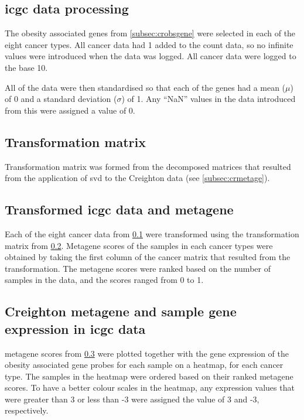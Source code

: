 \subsection{\gls{icgc} data processing}
\label{subsec:datprocicgc}

The obesity associated genes from \cref{subsec:crobsgene} were selected in each of the eight cancer types.
All cancer data had 1 added to the count data, so no infinite values were introduced when the data was logged.
All cancer data were logged to the base 10.

All of the data were then standardised so that each of the genes had a mean ($\mu$) of 0 and a standard deviation ($\sigma$) of 1.
Any ``NaN'' values in the data introduced from this were assigned a value of 0.

\subsection{Transformation matrix}
\label{subsec:transmatcr}

Transformation matrix was formed from the decomposed matrices that resulted from the application of \gls{svd} to the Creighton data (see \cref{subsec:crmetage}).

\subsection{Transformed \gls{icgc} data and metagene}
\label{subsec:icgctranscr}

Each of the eight cancer data from \cref{subsec:datprocicgc} were transformed using the transformation matrix from \cref{subsec:transmatcr}.
Metagene scores of the samples in each cancer types were obtained by taking the first column of the cancer matrix that resulted from the transformation.
The \gls{metagene} scores were ranked based on the number of samples in the data, and the scores ranged from 0 to 1.

\subsection{Creighton metagene and sample gene expression in \gls{icgc} data}
\label{subsec:crmetaicgcge}

\Gls{metagene} scores from \cref{subsec:icgctranscr} were plotted together with the gene expression of the obesity associated gene probes for each sample on a heatmap, for each cancer type.
The samples in the heatmap were ordered based on their ranked \gls{metagene} scores.
To have a better colour scales in the heatmap, any expression values that were greater than 3 or less than -3 were assigned the value of 3 and -3, respectively.

